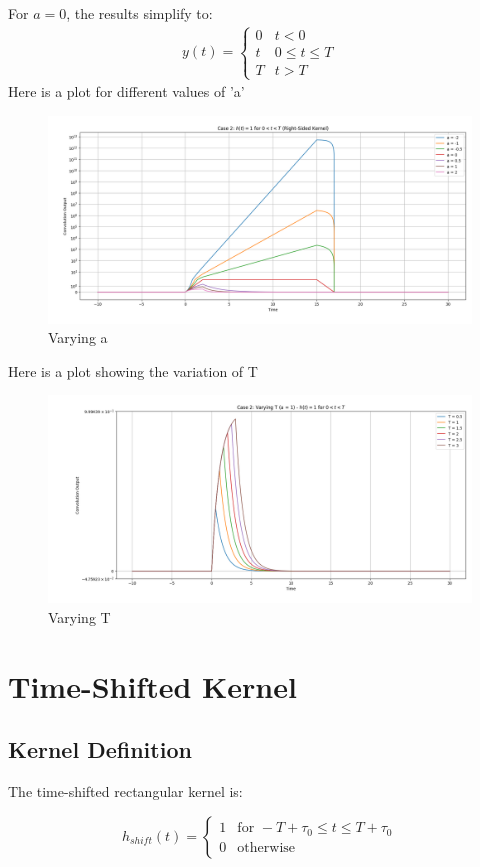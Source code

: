 \documentclass[12pt,a4paper,titlepage]{article}
\begin{document}
For $a = 0$, the results simplify to:
\begin{align}
y(t) = 
\begin{cases}
0 & t < 0 \\
t & 0 \leq t \leq T \\
T & t > T
\end{cases}
\end{align}
 Here is a plot for different values of 'a'
 \begin{figure}[H]
     \centering
     \includegraphics[width=0.8\linewidth]{plotseax/right side kernelvaryinga.png}
     \caption{Varying a}
     \label{fig:enter-label}
 \end{figure}
 Here is a plot showing the variation of T
 \begin{figure}[H]
     \centering
     \includegraphics[width=0.8\linewidth]{plotseax/right side kernelvaryingT.png}
     \caption{Varying T}
     \label{fig:enter-label}
 \end{figure}
\section{Time-Shifted Kernel}
\subsection{Kernel Definition}
The time-shifted rectangular kernel is:

\begin{equation}
h_{shift}(t) = 
\begin{cases} 
1 & \text{for } -T+\tau_0 \leq t \leq T+\tau_0 \\
0 & \text{otherwise}
\end{cases}
\end{equation}
\end{document}
